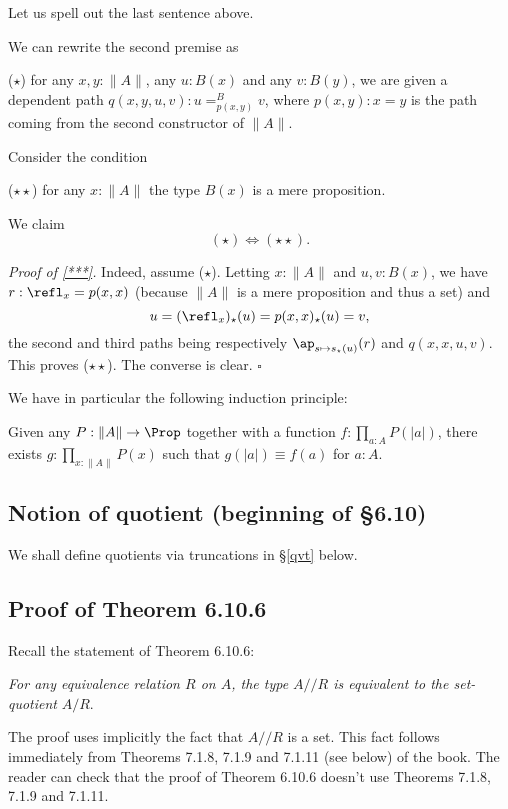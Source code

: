 \documentclass[12pt]{article}
\begin{document}
Let us spell out the last sentence above.

We can rewrite the second premise as

\nn($\star$) for any $x,y:\lVert A\rVert$, any $u:B(x)$ and any $v:B(y)$, we are given a dependent path $q(x,y,u,v):u=^B_{p(x,y)}v$, where $p(x,y):x=y$ is the path coming from the second constructor of $\lVert A\rVert$.

Consider the condition

\nn($\star\star$) for any $x:\lVert A\rVert$ the type $B(x)$ is a mere proposition.

We claim
\begin{equation}\label{***}
(\star)\iff(\star\star).
\end{equation}

\nn\emph{Proof of \eqref{***}.} Indeed, assume ($\star$). Letting $x:\lVert A\rVert$ and $u,v:B(x)$, we have $r:\refl_x=p(x,x)$ (because $\lVert A\rVert$ is a mere proposition and thus a set) and 
$$
u=(\refl_x)_\star(u)=p(x,x)_\star(u)=v,
$$ 
the second and third paths being respectively $\ap_{s\mapsto s_\star(u)}(r)$ and $q(x,x,u,v)$. This proves ($\star\star$). The converse is clear. $\square$

We have in particular the following induction principle:

Given any $P:\lVert A\rVert\to\Prop$ together with a function $f:\prod_{a:A}P(\lvert a\rvert)$, there exists $g:\prod_{x:\lVert A\rVert}P(x)$ such that $g(\lvert a\rvert)\equiv f(a)$ for $a:A$.


\subsection{Notion of quotient (beginning of \S6.10)}\label{610}

We shall define quotients via truncations in \S\ref{qvt} below.


\subsection{Proof of Theorem 6.10.6}%

Recall the statement of Theorem 6.10.6: 

\emph{For any equivalence relation $R$ on $A$, the type $A/\!\!/R$ is equivalent to the set-quotient} $A/R$.

The proof uses implicitly the fact that $A/\!\!/R$ is a set. This fact follows immediately from Theorems 7.1.8, 7.1.9 and 7.1.11 (see below) of the book. The reader can check that the proof of Theorem 6.10.6 doesn't use Theorems 7.1.8, 7.1.9 and 7.1.11.
\end{document}
